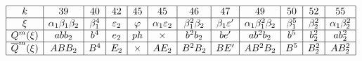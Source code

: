\documentclass{article}
\begin{document}
\(
\begin{array}{|c|*{11}{c|}}
  \hline
  k & 39 & 40 & 42 & 45 & 45 & 46 & 47 & 49 & 50 & 52 & 55 \\ \hline
  \xi & \alpha_1\beta_1\beta_2 & \beta_1^4 & \varepsilon_2 & \varphi & \alpha_1\varepsilon_2 & \beta_1^2\beta_2 & \beta_1\varepsilon' & \alpha_1\beta_1^2\beta_2 & \beta_1^5 & \beta_2^2 & \alpha_1\beta_2^2 \\ \hline
  Q^m(\xi) & abb_2 & b^4 & e_2 & ph & \times & b^2b_2 & be' & ab^2b_2 & b^5 & b_2^2 & ab_2^2 \\ \hline
  \overline{Q}^m(\xi) & ABB_2 & B^4 & E_2 & \times & AE_2 & B^2B_2 & BE' & AB^2B_2 & B^5 & B_2^2 & AB_2^2 \\ \hline
\end{array}
\)
\end{document}
